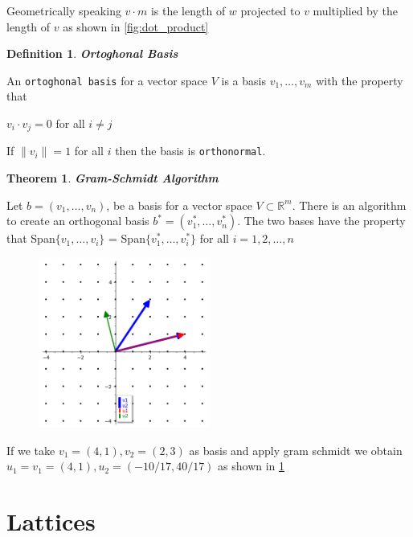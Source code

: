 \documentclass[a4paper,12pt]{report}
\newtheorem{definition}{Definition}[section]
\newtheorem{theorem}{Theorem}[section]
\newcommand{\R}{\mathbb{R}}
\newcommand{\dd}{\cdot}
\begin{document}
Geometrically speaking $v \cdot m$ is the length of $w$ projected to $v$ multiplied by the length of $v$ as shown in \ref{fig:dot_product}

\begin{definition}
    \textbf{Ortoghonal Basis} 
\end{definition}

An \texttt{ortoghonal basis} for a vector space $V$ is a basis $v_1, \ldots, v_m$ with the property that

\begin{center}
    $v_i \dd v_j = 0$ for all $i \neq j$
\end{center}

If $\lVert v_i \rVert = 1$ for all $i$ then the basis is \texttt{orthonormal}.

\begin{theorem}
    \textbf{Gram-Schmidt Algorithm}
\end{theorem}

Let $b = (v_1, \ldots, v_n)$, be a basis for a vector space $V \subset \R^m$. There is an algorithm to create an orthogonal basis
$b^* = (v_1^*,\ldots,v_n^*)$.
The two bases have the property that Span$\{v_1,\ldots,v_i\}$ = Span$\{v_1^*,\ldots,v_i^*\}$ for all $i = 1,2,\ldots,n$

\begin{figure}[htpb]
    \centering
    \includegraphics[width=0.5\textwidth]{./img/gram_schmidt.png}
    \caption{}
    \label{fig:gram_schmidt}
\end{figure}

If we take $v_1=(4, 1), v_2=(2, 3)$ as basis and apply gram schmidt we obtain $u_1=v_1=(4, 1), u_2=(-10/17, 40/17)$ as shown in \ref{fig:gram_schmidt}

\section{Lattices}
\end{document}
